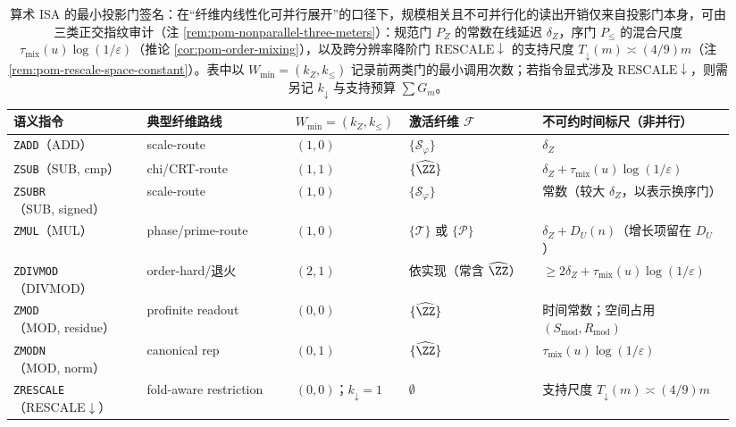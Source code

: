 \begin{table}[H]
\centering
\scriptsize
\setlength{\tabcolsep}{6pt}
\caption{算术 ISA 的最小投影门签名：在“纤维内线性化可并行展开”的口径下，规模相关且不可并行化的读出开销仅来自投影门本身，可由三类正交指纹审计（注 \ref{rem:pom-nonparallel-three-meters}）：规范门 \(P_Z\) 的常数在线延迟 \(\delta_Z\)，序门 \(P_{\le}\) 的混合尺度 \(\tau_{\mathrm{mix}}(u)\log(1/\varepsilon)\)（推论 \ref{cor:pom-order-mixing}），以及跨分辨率降阶门 \(\mathrm{RESCALE}\downarrow\) 的支持尺度 \(T_{\downarrow}(m)\asymp (4/9)m\)（注 \ref{rem:pom-rescale-space-constant}）。表中以 \(W_{\min}=(k_Z,k_{\le})\) 记录前两类门的最小调用次数；若指令显式涉及 \(\mathrm{RESCALE}\downarrow\)，则需另记 \(k_{\downarrow}\) 与支持预算 \(\sum G_m\)。}
\label{tab:pom-isa-minsig}
\begin{tabular}{p{0.18\linewidth} p{0.20\linewidth} p{0.12\linewidth} p{0.18\linewidth} p{0.26\linewidth}}
\toprule
语义指令 & 典型纤维路线 & $W_{\min}=(k_Z,k_{\le})$ & 激活纤维 $\mathcal{F}$ & 不可约时间标尺（非并行）\\
\midrule
\texttt{ZADD}（ADD） & scale-route & $(1,0)$ & $\{\mathcal{S}_\varphi\}$ & $\delta_Z$\\
\texttt{ZSUB}（SUB, cmp） & chi/CRT-route & $(1,1)$ & $\{\widehat{\ZZ}\}$ & $\delta_Z+\tau_{\mathrm{mix}}(u)\log(1/\varepsilon)$\\
\texttt{ZSUBR}（SUB, signed） & scale-route & $(1,0)$ & $\{\mathcal{S}_\varphi\}$ & 常数（较大 $\delta_Z$，以表示换序门）\\
\texttt{ZMUL}（MUL） & phase/prime-route & $(1,0)$ & $\{\mathcal{T}\}$ 或 $\{\mathcal{P}\}$ & $\delta_Z + D_U(n)$（增长项留在 $D_U$）\\
\texttt{ZDIVMOD}（DIVMOD） & order-hard/退火 & $(2,1)$ & 依实现（常含 $\widehat{\ZZ}$） & $\ge 2\delta_Z+\tau_{\mathrm{mix}}(u)\log(1/\varepsilon)$\\
\texttt{ZMOD}（MOD, residue） & profinite readout & $(0,0)$ & $\{\widehat{\ZZ}\}$ & 时间常数；空间占用 $(S_{\mathrm{mod}},R_{\mathrm{mod}})$\\
\texttt{ZMODN}（MOD, norm） & canonical rep & $(0,1)$ & $\{\widehat{\ZZ}\}$ & $\tau_{\mathrm{mix}}(u)\log(1/\varepsilon)$\\
\texttt{ZRESCALE}（RESCALE$\downarrow$） & fold-aware restriction & $(0,0)$；$k_{\downarrow}=1$ & $\emptyset$ & 支持尺度 $T_{\downarrow}(m)\asymp (4/9)m$\\
\bottomrule
\end{tabular}
\end{table}

